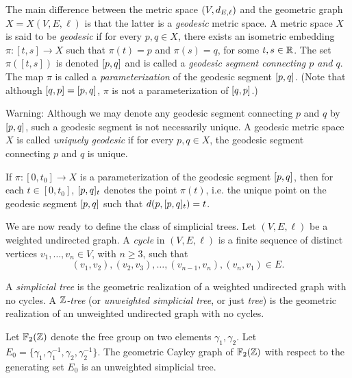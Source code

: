 \begin{remark}
\label{remarkgeodesicmetric}
The main difference between the metric space $(V,d_{E,\ell})$ and the geometric graph $X = X(V,E,\ell)$ is that the latter is a \emph{geodesic} metric space. A metric space $X$ is said to be \emph{geodesic} if for every $p,q\in X$, there exists an isometric embedding $\pi:[t,s]\to X$ such that $\pi(t) = p$ and $\pi(s) = q$, for some $t,s\in\R$. The set $\pi([t,s])$ is denoted $[p,q]$ and is called a \emph{geodesic segment connecting $p$ and $q$}. The map $\pi$ is called a \emph{parameterization} of the geodesic segment $[p,q]$. (Note that although $[q,p] = [p,q]$, $\pi$ is not a parameterization of $[q,p]$.)

Warning: Although we may denote any geodesic segment connecting $p$ and $q$ by $[p,q]$, such a geodesic segment is not necessarily unique. A geodesic metric space $X$ is called \emph{uniquely geodesic} if for every $p,q\in X$, the geodesic segment connecting $p$ and $q$ is unique.
\end{remark}

\begin{notation}
\label{notationgeopqt}
If $\pi:[0,t_0]\to X$ is a parameterization of the geodesic segment $[p,q]$, then for each $t\in[0,t_0]$, $[p,q]_t$ denotes the point $\pi(t)$, i.e. the unique point on the geodesic segment $[p,q]$ such that $d(p,[p,q]_t) = t$.
\end{notation}

We are now ready to define the class of simplicial trees. Let $(V,E,\ell)$ be a weighted undirected graph. A \emph{cycle} in $(V,E,\ell)$ is a finite sequence of distinct vertices $v_1,\ldots,v_n\in V$, with $n\geq 3$, such that
\begin{equation}
\label{cycle}
(v_1,v_2), (v_2,v_3), \ldots, (v_{n - 1},v_n), (v_n,v_1)\in E.
\end{equation}
\begin{definition}
\label{definitionweightedtree}
A \emph{simplicial tree} is the geometric realization of a weighted undirected graph with no cycles. A \emph{$\Z$-tree} (or \emph{unweighted simplicial tree}, or just \emph{tree}) is the geometric realization of an unweighted undirected graph with no cycles.
\end{definition}

\begin{example}
Let $\F_2(\Z)$ denote the free group on two elements $\gamma_1,\gamma_2$. Let $E_0 = \{\gamma_1,\gamma_1^{-1},\gamma_2,\gamma_2^{-1}\}$. The geometric Cayley graph of $\F_2(\Z)$ with respect to the generating set $E_0$ is an unweighted simplicial tree.
\end{example}


